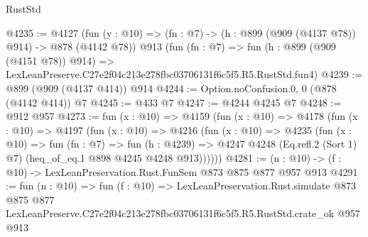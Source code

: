 \begin{lexlean}{RustStd}
\begin{coremodule}
@4235 := @4127
    (fun (y : @10) => (fn : @7) -> (h : @899 (@909 (@4137 @78)) @914) -> @878 (@4142 @78))
    @913
    (fun (fn : @7) =>
    fun (h : @899 (@909 (@4151 @78)) @914) =>
    LexLeanPreserve.C27e2f04c213e278fbc03706131f6c5f5.R5.RustStd.fun4)
@4239 := @899 (@909 (@4137 @414)) @914
@4244 := Option.noConfusion.{0, 0} (@878 (@4142 @414)) @7
@4245 := @433 @7
@4247 := @4244 @4245 @7
@4248 := @912 @957
@4273 := fun (x : @10) =>
  @4159
    (fun (x : @10) =>
    @4178
      (fun (x : @10) =>
      @4197
        (fun (x : @10) =>
        @4216
          (fun (x : @10) =>
          @4235
            (fun (x : @10) =>
            fun (fn : @7) =>
            fun (h : @4239) =>
            @4247 @4248 (Eq.refl.{2} (Sort 1) @7) (heq_of_eq.{1} @898 @4245 @4248 @913))))))
@4281 := (n : @10) -> (f : @10) -> LexLeanPreservation.Rust.FunSem @873 @875 @877 @957 @913
@4291 := fun (n : @10) =>
  fun (f : @10) =>
  LexLeanPreservation.Rust.simulate
    @873
    @875
    @877
    LexLeanPreserve.C27e2f04c213e278fbc03706131f6c5f5.R5.RustStd.crate_ok
    @957
    @913
\end{coremodule}
\end{lexlean}
